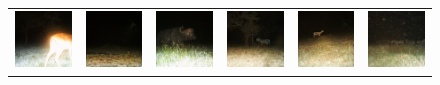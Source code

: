 \begin{figure}[htp!]
\begin{tabularx}{\textwidth}{Y Y Y !{\space} Y Y Y}
        \includegraphics{gfx/unconditional-diffusion-sampling-qual/rgb_S2_B05_R2_IMAG0016.jpg} & \includegraphics{gfx/unconditional-diffusion-sampling-qual/cyclegan_S2_B06_R3_PICT3848_fake.png} & \includegraphics{gfx/unconditional-diffusion-sampling-qual/diffusion_S2_B07_R2_PICT0277.png} & \includegraphics{gfx/unconditional-diffusion-sampling-qual/rgb_S2_B05_R3_IMAG1018.jpg} & \includegraphics{gfx/unconditional-diffusion-sampling-qual/cyclegan_S2_B07_R1_PICT3274_fake.png} & \includegraphics{gfx/unconditional-diffusion-sampling-qual/diffusion_S2_B07_R1_PICT3274.png}

\end{tabularx}
\end{figure}
